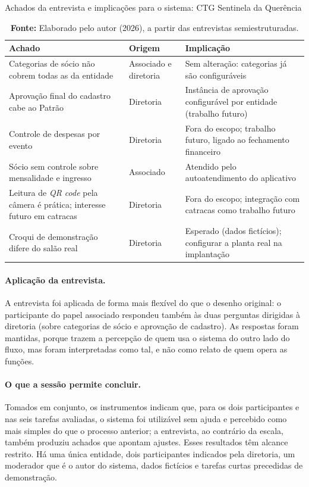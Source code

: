 \documentclass[12pt,a4paper]{article}
\begin{document}
\begin{table}[H]
  \centering
  \caption{Achados da entrevista e implicações para o sistema: CTG Sentinela da Querência}
  \label{tab:ctg-achados}
  \begin{tabular}{@{}L{4.6cm}L{2.2cm}L{6.1cm}@{}}
    \toprule
    \textbf{Achado} & \textbf{Origem} & \textbf{Implicação} \\
    \midrule
    Categorias de sócio não cobrem todas as da entidade & Associado e diretoria
      & Sem alteração: categorias já são configuráveis \\
    Aprovação final do cadastro cabe ao Patrão & Diretoria
      & Instância de aprovação configurável por entidade (trabalho futuro) \\
    Controle de despesas por evento & Diretoria
      & Fora do escopo; trabalho futuro, ligado ao fechamento financeiro \\
    Sócio sem controle sobre mensalidade e ingresso & Associado
      & Atendido pelo autoatendimento do aplicativo \\
    Leitura de \textit{QR code} pela câmera é prática; interesse futuro em catracas & Diretoria
      & Fora do escopo; integração com catracas como trabalho futuro \\
    Croqui de demonstração difere do salão real & Diretoria
      & Esperado (dados fictícios); configurar a planta real na implantação \\
    \bottomrule
  \end{tabular}
  \caption*{\textbf{Fonte:} Elaborado pelo autor (2026), a partir das entrevistas semiestruturadas.}
\end{table}

\paragraph{Aplicação da entrevista.} A entrevista foi aplicada de forma mais
flexível do que o desenho original: o participante do papel associado respondeu também às duas
perguntas dirigidas à diretoria (sobre categorias de sócio e aprovação de cadastro). As respostas
foram mantidas, porque trazem a percepção de quem usa o sistema do outro lado do fluxo, mas foram
interpretadas como tal, e não como relato de quem opera as funções.

\paragraph{O que a sessão permite concluir.} Tomados em conjunto, os instrumentos indicam que, para
os dois participantes e nas seis tarefas avaliadas, o sistema foi utilizável sem ajuda e percebido
como mais simples do que o processo anterior; a entrevista, ao contrário da escala, também produziu
achados que apontam ajustes. Esses resultados têm alcance restrito. Há uma única entidade, dois
participantes indicados pela diretoria, um moderador que é o autor do sistema, dados fictícios e
tarefas curtas precedidas de demonstração.
\end{document}
